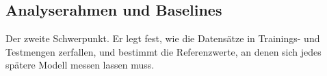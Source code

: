 \documentclass[12pt,a4paper]{article}
\begin{document}
\subsection{Analyserahmen und Baselines}
\label{sec:rahmen-baselines}

Der zweite Schwerpunkt. Er legt fest, wie die Datensätze in Trainings- und
Testmengen zerfallen, und bestimmt die Referenzwerte, an denen sich jedes
spätere Modell messen lassen muss.

\end{document}
